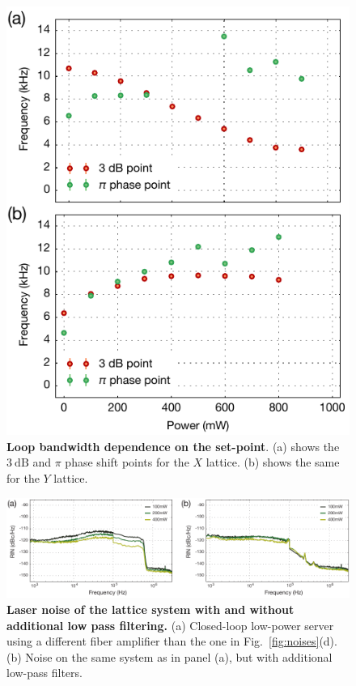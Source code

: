 \documentclass[twocolumn,aps,pra,showpacs,preprintnumbers,bibnotes]{revtex4-1}
\newcommand\unit[2]{\ensuremath{#1~\mathrm{{#2}}}}
\begin{document}
\begin{figure}
  \begin{center}
    \includegraphics{Figure10.pdf}
    \caption{\textbf{Loop bandwidth dependence on the set-point}. (a) shows the \unit{3}{dB} and $\pi$ phase shift points for the $X$ lattice. (b) shows the same for the $Y$ lattice.}\label{fig:bandwidth}
  \end{center}
\end{figure}

\begin{figure}
  \begin{center}
    \includegraphics{Figure11.pdf}
    \caption{\textbf{Laser noise of the lattice system with and without additional low pass filtering.} (a) Closed-loop low-power server using a different fiber amplifier than the one in Fig.~\ref{fig:noises}(d). (b) Noise on the same system as in panel (a), but with additional low-pass filters.}\label{fig:low_pass_noises}
  \end{center}
\end{figure}
\end{document}
